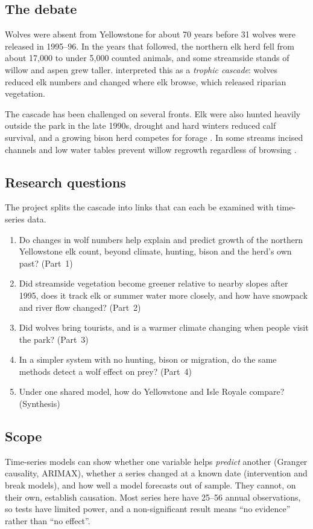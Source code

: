 \documentclass[11pt,a4paper]{article}
\begin{document}
\subsection{The debate}
Wolves were absent from Yellowstone for about 70 years before 31 wolves were released in 1995--96. In the years that followed, the northern elk herd fell from about 17{,}000 to under 5{,}000 counted animals, and some streamside stands of willow and aspen grew taller. \citet{ripple2012} interpreted this as a \emph{trophic cascade}: wolves reduced elk numbers and changed where elk browse, which released riparian vegetation.

The cascade has been challenged on several fronts. Elk were also hunted heavily outside the park in the late 1990s, drought and hard winters reduced calf survival, and a growing bison herd competes for forage \citep{macnulty2016,eberhardt2007}. In some streams incised channels and low water tables prevent willow regrowth regardless of browsing \citep{marshall2013,hobbs2024}.

\subsection{Research questions}
The project splits the cascade into links that can each be examined with time-series data.
\begin{enumerate}[label=\textbf{RQ\arabic*.}]
\item Do changes in wolf numbers help explain and predict growth of the northern Yellowstone elk count, beyond climate, hunting, bison and the herd's own past? (Part~1)
\item Did streamside vegetation become greener relative to nearby slopes after 1995, does it track elk or summer water more closely, and how have snowpack and river flow changed? (Part~2)
\item Did wolves bring tourists, and is a warmer climate changing when people visit the park? (Part~3)
\item In a simpler system with no hunting, bison or migration, do the same methods detect a wolf effect on prey? (Part~4)
\item Under one shared model, how do Yellowstone and Isle Royale compare? (Synthesis)
\end{enumerate}

\subsection{Scope}
Time-series models can show whether one variable helps \emph{predict} another (Granger causality, ARIMAX), whether a series changed at a known date (intervention and break models), and how well a model forecasts out of sample. They cannot, on their own, establish causation. Most series here have 25--56 annual observations, so tests have limited power, and a non-significant result means ``no evidence'' rather than ``no effect''.
\end{document}
